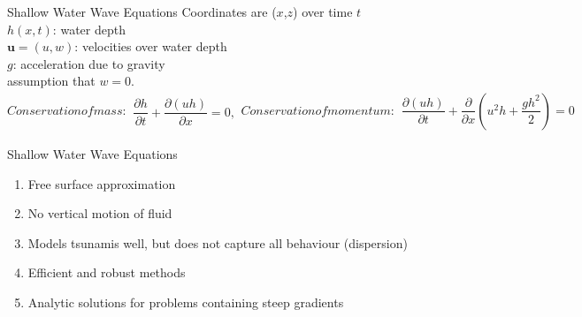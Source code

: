 \documentclass[pdf]{beamer}
\begin{document}
\begin{frame}{Shallow Water Wave Equations}
Coordinates are ($x$,$z$) over time $t$ \\
$h(x,t)$: water depth \\
$\mathbf{u} = (u,w)$: velocities over water depth \\
$g$: acceleration due to gravity\\
assumption that $w = 0$. 
	\begin{subequations}
		Conservation of mass:
		\begin{gather*}
		\dfrac{\partial h}{\partial t} + \dfrac{\partial (uh)}{\partial x} = 0,
		\end{gather*}
		Conservation of momentum:
		\begin{gather*}
		\dfrac{\partial (uh)}{\partial t} + \dfrac{\partial}{\partial x} \left ( u^2h + \dfrac{gh^2}{2}\right ) = 0 
		\end{gather*}
	\end{subequations}

\end{frame}

\begin{frame}{Shallow Water Wave Equations}
	
\begin{enumerate}
	\pause
	\item Free surface approximation
	\pause
	\item No vertical motion of fluid
	\pause
	\item Models tsunamis well, but does not capture all behaviour (dispersion)
	\pause
	\item Efficient and robust methods
	\pause
	\item Analytic solutions for problems containing steep gradients
\end{enumerate}
\end{frame}
\end{document}
